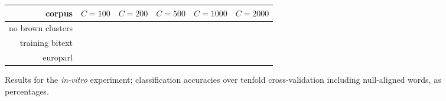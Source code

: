 \documentclass[10pt, a4paper]{article}
\begin{document}

\begin{figure*}[t!]
  \begin{center}
  \begin{tabular}{|r|r|r|r|r|r|}
    \hline
    corpus          & $C=100$ & $C=200$ & $C=500$ & $C=1000$ & $C=2000$ \\
    \hline
    no brown clusters &    & & & &  \\
    training bitext &                            &         &         &          &          \\
    europarl        &                            &         &         &          &          \\
    \hline
  \end{tabular}
  \end{center}
\caption{Results for the \emph{in-vitro} experiment; classification accuracies
over tenfold cross-validation including null-aligned words, as percentages. }
\label{fig:theresults1}
\end{figure*}
\end{document}
